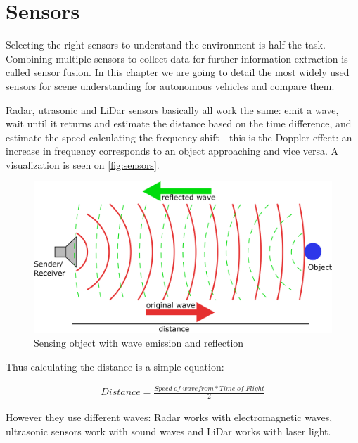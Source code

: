 \chapter{Sensors}
\label{chap:sensors}

Selecting the right sensors to understand the environment is half the task.
Combining multiple sensors to collect data for further information extraction is
called sensor fusion. In this chapter we are going to detail the most widely
used sensors for scene understanding for autonomous vehicles and compare them. 

Radar, utrasonic and LiDar sensors basically all work the same: emit a wave,
wait until it returns and estimate the distance based on the time difference,
and estimate the speed calculating the frequency shift - this is the Doppler
effect: an increase in frequency corresponds to an object approaching and vice
versa. A visualization is seen on \autoref{fig:sensors}.

\begin{figure}[!ht]
    \centering
    \includegraphics[width=150mm, keepaspectratio]{figures/sensors.png}
    \caption{Sensing object with wave emission and reflection}
    \label{fig:sensors}
\end{figure}

Thus calculating the distance is a simple equation:

\begin{align}
Distance=\frac{Speed\; of\; wavefrom * Time\; of\; Flight}{2}
\end{align}

However they use different waves: Radar works with electromagnetic waves,
ultrasonic sensors work with sound waves and LiDar works with laser light.

